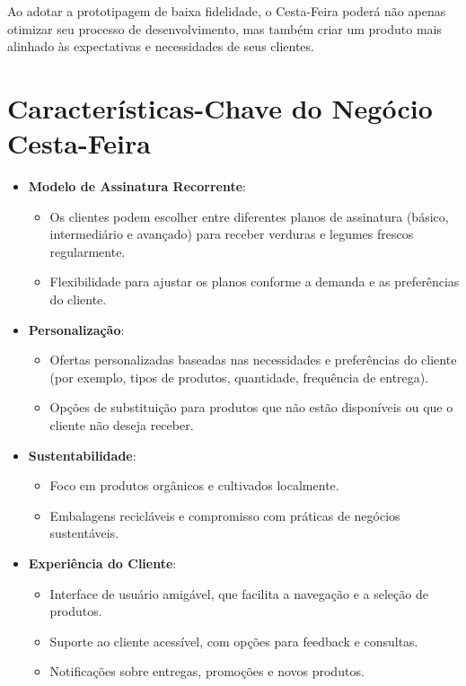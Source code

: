 \documentclass{article}
\begin{document}
Ao adotar a prototipagem de baixa fidelidade, o Cesta-Feira poderá não apenas otimizar seu processo de desenvolvimento, mas também criar um produto mais alinhado às expectativas e necessidades de seus clientes.

\section{Características-Chave do Negócio Cesta-Feira}
\begin{itemize}
    \item \textbf{Modelo de Assinatura Recorrente}:
    \begin{itemize}
        \item Os clientes podem escolher entre diferentes planos de assinatura (básico, intermediário e avançado) para receber verduras e legumes frescos regularmente.
        \item Flexibilidade para ajustar os planos conforme a demanda e as preferências do cliente.
    \end{itemize}

    \item \textbf{Personalização}:
    \begin{itemize}
        \item Ofertas personalizadas baseadas nas necessidades e preferências do cliente (por exemplo, tipos de produtos, quantidade, frequência de entrega).
        \item Opções de substituição para produtos que não estão disponíveis ou que o cliente não deseja receber.
    \end{itemize}

    \item \textbf{Sustentabilidade}:
    \begin{itemize}
        \item Foco em produtos orgânicos e cultivados localmente.
        \item Embalagens recicláveis e compromisso com práticas de negócios sustentáveis.
    \end{itemize}

    \item \textbf{Experiência do Cliente}:
    \begin{itemize}
        \item Interface de usuário amigável, que facilita a navegação e a seleção de produtos.
        \item Suporte ao cliente acessível, com opções para feedback e consultas.
        \item Notificações sobre entregas, promoções e novos produtos.
    \end{itemize}


\end{itemize}
\end{document}
